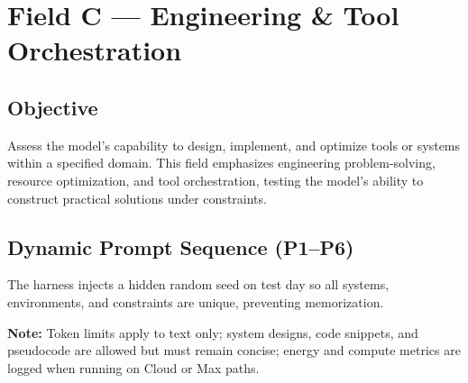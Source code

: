 \section{Field C — Engineering \& Tool Orchestration}
\label{sec:fieldC}

\subsection*{Objective}
Assess the model's capability to design, implement, and optimize tools or systems within a specified domain. This field emphasizes engineering problem-solving, resource optimization, and tool orchestration, testing the model's ability to construct practical solutions under constraints.

\subsection*{Dynamic Prompt Sequence (P1–P6)}
The harness injects a hidden random seed on test day so all systems, environments, and constraints are unique, preventing memorization.

\textbf{Note:} Token limits apply to text only; system designs, code snippets, and pseudocode are allowed but must remain concise; energy and compute metrics are logged when running on Cloud or Max paths.

